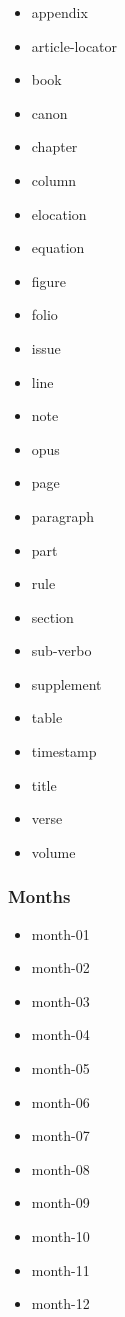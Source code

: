 \begin{itemize}
\tightlist
\item
  appendix
\item
  article-locator
\item
  book
\item
  canon
\item
  chapter
\item
  column
\item
  elocation
\item
  equation
\item
  figure
\item
  folio
\item
  issue
\item
  line
\item
  note
\item
  opus
\item
  page
\item
  paragraph
\item
  part
\item
  rule
\item
  section
\item
  sub-verbo
\item
  supplement
\item
  table
\item
  timestamp
\item
  title
\item
  verse
\item
  volume
\end{itemize}

\hypertarget{months}{%
\subsubsection{Months}\label{months}}

\begin{itemize}
\tightlist
\item
  month-01
\item
  month-02
\item
  month-03
\item
  month-04
\item
  month-05
\item
  month-06
\item
  month-07
\item
  month-08
\item
  month-09
\item
  month-10
\item
  month-11
\item
  month-12
\end{itemize}


